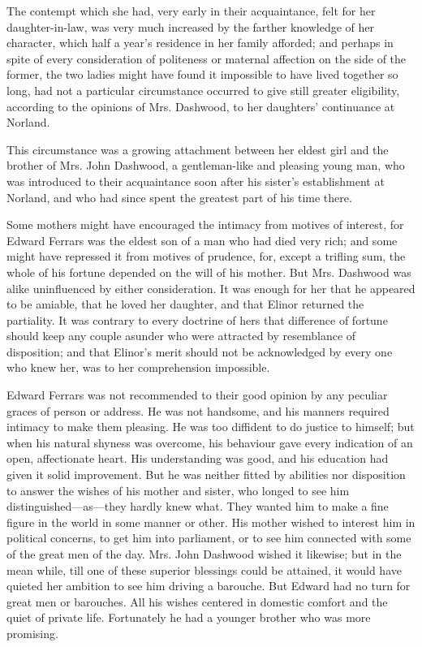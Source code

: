 The contempt which she had, very early in their acquaintance, felt for her daughter-in-law, was very much increased by the farther knowledge of her character, which half a year's residence in her family afforded; and perhaps in spite of every consideration of politeness or maternal affection on the side of the former, the two ladies might have found it impossible to have lived together so long, had not a particular circumstance occurred to give still greater eligibility, according to the opinions of Mrs. Dashwood, to her daughters' continuance at Norland.

This circumstance was a growing attachment between her eldest girl and the brother of Mrs. John Dashwood, a gentleman-like and pleasing young man, who was introduced to their acquaintance soon after his sister's establishment at Norland, and who had since spent the greatest part of his time there.

Some mothers might have encouraged the intimacy from motives of interest, for Edward Ferrars was the eldest son of a man who had died very rich; and some might have repressed it from motives of prudence, for, except a trifling sum, the whole of his fortune depended on the will of his mother. But Mrs. Dashwood was alike uninfluenced by either consideration. It was enough for her that he appeared to be amiable, that he loved her daughter, and that Elinor returned the partiality. It was contrary to every doctrine of hers that difference of fortune should keep any couple asunder who were attracted by resemblance of disposition; and that Elinor's merit should not be acknowledged by every one who knew her, was to her comprehension impossible.

Edward Ferrars was not recommended to their good opinion by any peculiar graces of person or address. He was not handsome, and his manners required intimacy to make them pleasing. He was too diffident to do justice to himself; but when his natural shyness was overcome, his behaviour gave every indication of an open, affectionate heart. His understanding was good, and his education had given it solid improvement. But he was neither fitted by abilities nor disposition to answer the wishes of his mother and sister, who longed to see him distinguished---as---they hardly knew what. They wanted him to make a fine figure in the world in some manner or other. His mother wished to interest him in political concerns, to get him into parliament, or to see him connected with some of the great men of the day. Mrs. John Dashwood wished it likewise; but in the mean while, till one of these superior blessings could be attained, it would have quieted her ambition to see him driving a barouche. But Edward had no turn for great men or barouches. All his wishes centered in domestic comfort and the quiet of private life. Fortunately he had a younger brother who was more promising.

